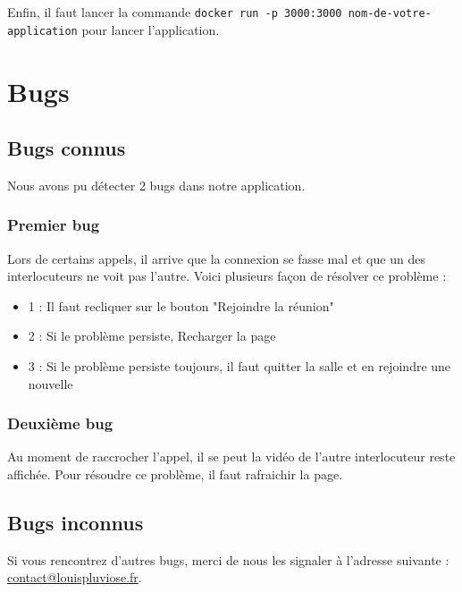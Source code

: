 \documentclass[12pt, a4paper, oneside]{article}
\begin{document}
Enfin, il faut lancer la commande \verb|docker run -p 3000:3000 nom-de-votre-application| pour lancer l'application.\\

\newpage

\section{Bugs}

\subsection{Bugs connus}

Nous avons pu détecter 2 bugs dans notre application.\\

\subsubsection{Premier bug}

Lors de certains appels, il arrive que la connexion se fasse mal et que un des interlocuteurs ne voit pas l'autre. Voici plusieurs façon de résolver ce problème :\\

\begin{itemize}
  \item 1 : Il faut recliquer sur le bouton "Rejoindre la réunion"
  \item 2 : Si le problème persiste, Recharger la page
  \item 3 : Si le problème persiste toujours, il faut quitter la salle et en rejoindre une nouvelle
\end{itemize}

\subsubsection{Deuxième bug}

Au moment de raccrocher l'appel, il se peut la vidéo de l'autre interlocuteur reste affichée. Pour résoudre ce problème, il faut rafraichir la page.\\

\subsection{Bugs inconnus}

Si vous rencontrez d'autres bugs, merci de nous les signaler à l'adresse suivante : \href{mailto:contact@louispluviose.fr}{contact@louispluviose.fr}.\\
\end{document}
